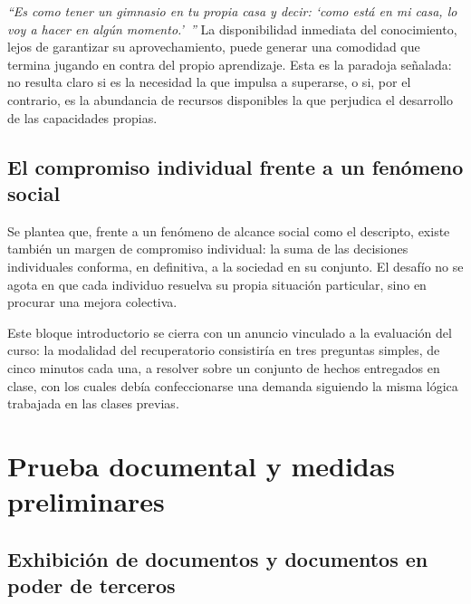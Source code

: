 \documentclass[12pt,oneside]{book}
\begin{document}
\begin{important}
\textit{``Es como tener un gimnasio en tu propia casa y decir: `como está en mi casa, lo voy a hacer en algún momento.'\ ''} La disponibilidad inmediata del conocimiento, lejos de garantizar su aprovechamiento, puede generar una comodidad que termina jugando en contra del propio aprendizaje. Esta es la paradoja señalada: no resulta claro si es la necesidad la que impulsa a superarse, o si, por el contrario, es la abundancia de recursos disponibles la que perjudica el desarrollo de las capacidades propias.
\end{important}

\section{El compromiso individual frente a un fenómeno social}

Se plantea que, frente a un fenómeno de alcance social como el descripto, existe también un margen de compromiso individual: la suma de las decisiones individuales conforma, en definitiva, a la sociedad en su conjunto. El desafío no se agota en que cada individuo resuelva su propia situación particular, sino en procurar una mejora colectiva.


Este bloque introductorio se cierra con un anuncio vinculado a la evaluación del curso: la modalidad del recuperatorio consistiría en tres preguntas simples, de cinco minutos cada una, a resolver sobre un conjunto de hechos entregados en clase, con los cuales debía confeccionarse una demanda siguiendo la misma lógica trabajada en las clases previas.

\chapter[Prueba documental y medidas prelim.]{Prueba documental y medidas preliminares}

\section{Exhibición de documentos y documentos en poder de terceros}
\end{document}
